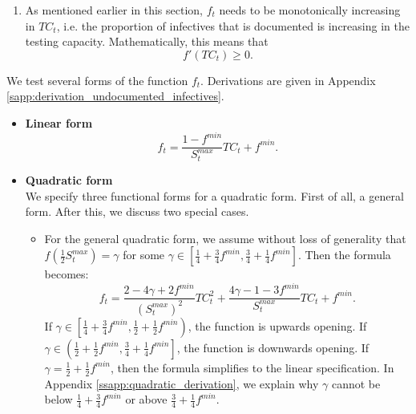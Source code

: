 \documentclass[12pt]{article}
\begin{document}
\begin{enumerate}[label=(A\arabic*)]
		\item\label{ass:undoc_monotonicity} As mentioned earlier in this section, $f_t$ needs to be monotonically increasing in $TC_t$, i.e. the proportion of infectives that is documented is increasing in the testing capacity. Mathematically, this means that
		    \[f'(TC_t) \geq 0.\]
	\end{enumerate}
	
	We test several forms of the function $f_t$. Derivations are given in Appendix \ref{sapp:derivation_undocumented_infectives}.
	\begin{itemize}
		\item \textbf{Linear form}
		    \begin{equation} \label{eq:linear_functional_form}
		        f_t = \frac{1-f^{min}}{S^{max}_t}TC_t + f^{min}.
		    \end{equation}
    		
    	\item \textbf{Quadratic form}\\
    	We specify three functional forms for a quadratic form. First of all, a general form. After this, we discuss two special cases.
    	    \begin{itemize}
    	        \item For the general quadratic form, we assume without loss of generality that $f\left(\frac{1}{2}S^{max}_t\right) = \gamma$ for some $\gamma \in \left[\frac{1}{4} + \frac{3}{4}f^{min}, \frac{3}{4} + \frac{1}{4} f^{min}\right]$. Then the formula becomes:
    	            \begin{equation} \label{eq:quadratic_functional_form}
    	                f_t = \frac{2 - 4\gamma + 2f^{min}}{\left(S^{max}_t\right)^2}TC_t^2 + \frac{4\gamma - 1 - 3f^{min}}{S^{max}_t}TC_t + f^{min}.
    	            \end{equation}
		        If $\gamma \in \left[\frac{1}{4} + \frac{3}{4}f^{min}, \frac{1}{2} + \frac{1}{2}f^{min}\right)$, the function is upwards opening. If $\gamma \in \left(\frac{1}{2} + \frac{1}{2}f^{min}, \frac{3}{4} + \frac{1}{4} f^{min}\right]$, the function is downwards opening. If $\gamma = \frac{1}{2} + \frac{1}{2}f^{min}$, then the formula simplifies to the linear specification. In Appendix \ref{ssapp:quadratic_derivation}, we explain why $\gamma$ cannot be below $\frac{1}{4} + \frac{3}{4}f^{min}$ or above $\frac{3}{4} + \frac{1}{4} f^{min}$.
		        

\end{itemize}
\end{itemize}
\end{document}
